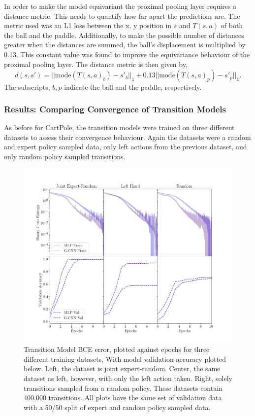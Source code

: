 In order to make the model equivariant the proximal pooling layer requires  a distance metric. This needs to quantify how far apart the predictions are. The metric used was an L1 loss between the x, y position in $s$ and $T(s,a)$ of both the ball and the paddle. Additionally, to make the possible number of distances greater when the distances are summed, the ball's displacement is multiplied by 0.13. This constant value was found to improve the equivariance behaviour of the proximal pooling layer. The distance metric is then given by,
\begin{equation}
	d(s, s') = ||\text{mode}(T(s, a)_b) - s'_b||_1 + 0.13 ||\text{mode}(T(s, a)_p )- s'_p||_1.
\end{equation}
The subscripts, $b, p$ indicate the ball and the paddle, respectively.

\subsubsection{Results: Comparing Convergence of Transition Models}
As before for CartPole, the transition models were trained on three different datasets to assess their convergence behaviour. Again the datasets were a random and expert policy sampled data, only left actions from the previous dataset, and only random policy sampled transitions.

\begin{figure}
	\centering
	\includegraphics[width=\linewidth]{Figures/transition_model_catch.png}
	\caption{Transition Model BCE error, plotted against epochs for three different training datasets, With model validation accuracy plotted below. Left, the dataset is joint expert-random. Center, the same dataset as left, however, with only the left action taken. Right, solely transitions sampled from a random policy. These datasets contain 400,000 transitions. All plots have the same set of validation data with a 50/50 split of expert and random policy sampled data.}
	\label{fig:tm_catch}
\end{figure}

